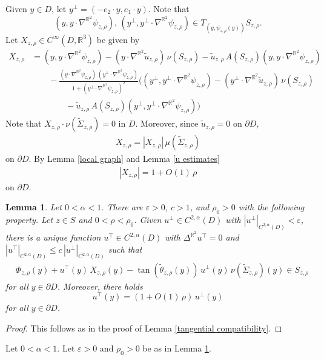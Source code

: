 \documentclass[11pt]{amsart}
\newtheorem{lem}[prop]{Lemma}
\begin{document}
Given $y\in D$, let $y^\perp=(-e_2\cdot y,e_1\cdot y)$. Note that 
$$(y,y\cdot \nabla^{\mathbb{R}^2}\psi_{z,\rho}),\, (y^\perp,y^\perp\cdot \nabla^{\mathbb{R}^2}\psi_{z,\rho})\in T_{(y,\psi_{z,\rho}(y))}S_{z,\rho}.$$  
Let $X_{z,\rho} \in C^\infty(D,\mathbb{R}^3)$ be given by 
\begin{align*} 
X_{z,\rho}&=(y,y\cdot\nabla^{\mathbb{R}^2} \psi_{z,\rho})-(y\cdot \nabla^{\mathbb{R}^2} \tilde u_{z,\rho})\, \nu(S_{z,\rho})-\tilde u_{z,\rho}\, A(S_{z,\rho})(y,y\cdot \nabla^{\mathbb{R}^2}\psi_{z,\rho})
\\&\qquad -\frac{(y\cdot \nabla^{\mathbb{R}^2}\psi_{z,\rho})\,(y^\perp \cdot \nabla^{\mathbb{R}^2}\psi_{z,\rho})}{1+(y^\perp \cdot \nabla^{\mathbb{R}^2}\psi_{z,\rho})^2} \bigg((y^\perp,y^\perp\cdot \nabla^{\mathbb{R}^2}\psi_{z,\rho})-(y^\perp \cdot \nabla^{\mathbb{R}^2} \tilde u_{z,\rho})\, \nu(S_{z,\rho})
\\&\qquad\qquad -\tilde u_{z,\rho}\, A(S_{z,\rho})(y^\perp,y^\perp\cdot \nabla^{\mathbb{R}^2}\psi_{z,\rho})\bigg)
\end{align*} 
Note that $X_{z,\rho}\cdot \nu(\tilde \Sigma_{z,\rho})=0$ in $D$. Moreover, since $\tilde u_{z,\rho}=0$ on $\partial D$,  
\begin{align} \label{tangetial at boundary} X_{z,\rho}=|X_{z,\rho}|\,\mu(\tilde \Sigma_{z,\rho})
\end{align} 
on $\partial D$. By Lemma \ref{local graph} and Lemma \ref{u estimates}
\begin{align*} 
	|X_{z,\rho}|=1+O(1)\,\rho
\end{align*} 
on $\partial D$.



\begin{lem} \label{tangential compatibility 2}
Let $0<\alpha<1$.	There are $\varepsilon>0$, $c>1$, and $\rho_0>0$ with the following property.  Let $z\in S$ and $0<\rho<\rho_0$. Given   $u^\perp \in C^{2,\alpha}(D)$ with $|u^\perp|_{C^{2,\alpha}(D)}<\varepsilon$, there is a unique  function $u^\top \in C^{2,\alpha}(D)$ with $\Delta^{\mathbb{R}^2}u^\top=0$ and $|u^\top|_{C^{2,\alpha}(D)}\leq c\,|u^\perp|_{C^{2,\alpha}(D)}$ such that 
	\begin{equation*}  
		\begin{aligned} 
			& \Phi_{z,\rho}(y)	+u^\top(y)\, X_{z,\rho}(y)-\tan(\tilde \theta_{z,\rho}(y))\,u^\perp(y)\,\nu(\tilde \Sigma_{z,\rho})(y)\in S_{z,\rho}
		\end{aligned} 
	\end{equation*} 
	for all $y\in \partial D$. 
Moreover, there holds
$$
u^\top(y)=(1+O(1)\,\rho)\,u^\perp(y)
$$
for all $y\in \partial D$.
\end{lem}
\begin{proof}
This follows as in the proof of Lemma \ref{tangential compatibility}.
\end{proof}
Let $0<\alpha<1$. Let $\varepsilon>0$ and $\rho_0>0$ be as in Lemma \ref{tangential compatibility 2}. 
\end{document}
